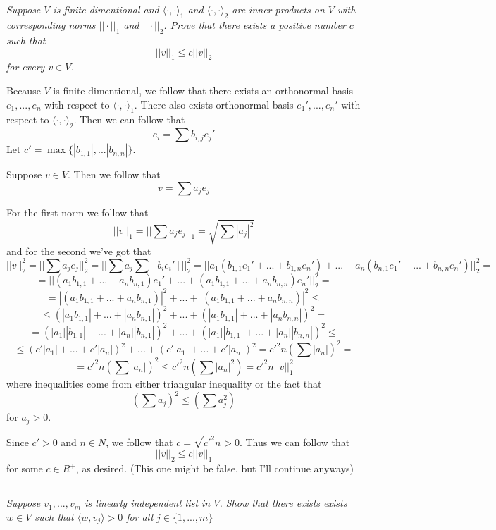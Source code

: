\documentclass[11pt,oneside,titlepage]{book}
\newcommand{\eangle}[1]{\langle #1 \rangle}
\begin{document}
\subsection{}

\textit{Suppose $V$ is finite-dimentional and $\eangle{\cdot, \cdot}_1$ and
  $\eangle{\cdot, \cdot}_2$ are inner products on $V$ with corresponding norms $|| \cdot ||_1$
  and $|| \cdot ||_2$. Prove that there exists a positive number $c$ such that }
$$||v||_1 \leq c||v||_2$$
\textit{for every $v \in V$.}

Because $V$ is finite-dimentional, we follow that there exists an orthonormal basis $e_1, ..., e_n$
with respect to $\eangle{\cdot, \cdot}_1$. There also exists orthonormal basis $e_1', ..., e_n'$
with respect to $\eangle{\cdot, \cdot}_2$.
Then we can follow that 
$$e_i = \sum{b_{i, j} e_j'}$$
Let $c' = \max \{|b_{1, 1}|, ... |b_{n, n}|\}$.

Suppose $v \in V$. Then we follow that
$$v = \sum{a_j e_j}$$

For the first norm we follow that 
$$||v||_1 = ||\sum{a_j e_j}||_1 = \sqrt{\sum{|a_j|^2}}$$
and for the second we've got that
$$||v||_2^2 = ||\sum{a_j e_j}||_2^2 = ||\sum{a_j \sum{[b_i e_i']}}||_2^2 =
||a_1 (b_{1, 1} e_1' + ... + b_{1, n} e_n') + ... + a_n (b_{n, 1} e_1' + ... + b_{n, n} e_n')||_2^2 = 
$$
$$ =
||(a_1 b_{1, 1} + ... + a_nb_{n, 1})e_1' + ... + (a_1 b_{1, 1} + ... + a_nb_{n, n})e_n'||_2^2 = $$
$$ = |(a_1 b_{1, 1} + ... + a_nb_{n, 1})|^2 + ... + |(a_1 b_{1, 1} + ... + a_nb_{n, n})|^2 \leq $$
$$ \leq  (|a_1 b_{1, 1}| + ... + |a_nb_{n, 1}|)^2 + ... + (|a_1 b_{1, 1}| + ... + |a_nb_{n, n}|)^2 =  $$
$$ = (|a_1|| b_{1, 1}| + ... + |a_n||b_{n, 1}|)^2 + ... + (|a_1||b_{1, 1}| + ... + |a_n||b_{n, n}|)^2 \leq$$
$$ \leq (c' |a_1| + ... + c'|a_n|)^2 + ... + (c' |a_1| + ... + c'|a_n|)^2 = c'^2 n (\sum{|a_n|})^2 =
$$
$$ = 
c'^2n(\sum{|a_n|})^2 \leq c'^2n(\sum{|a_n|^2}) = c'^2n ||v||_1^2$$
where inequalities come from either triangular inequality or the fact that
$$(\sum{a_j})^2 \leq(\sum{a_j^2})$$
for $a_j > 0$.

Since $c' > 0$ and $n \in N$, we follow that $c = \sqrt{c'^2n} > 0$. Thus we can follow that
$$||v||_2 \leq c ||v||_1$$
for some $c \in R^+$, as desired. (This one might be false, but I'll continue anyways)

\subsection{}

\textit{Suppose $v_1, ..., v_m$ is linearly independent list in $V$. Show that there exists
  exists $w \in V$ such that $\eangle{w, v_j} > 0$ for all $j \in \{1, ..., m\}$}
\end{document}
